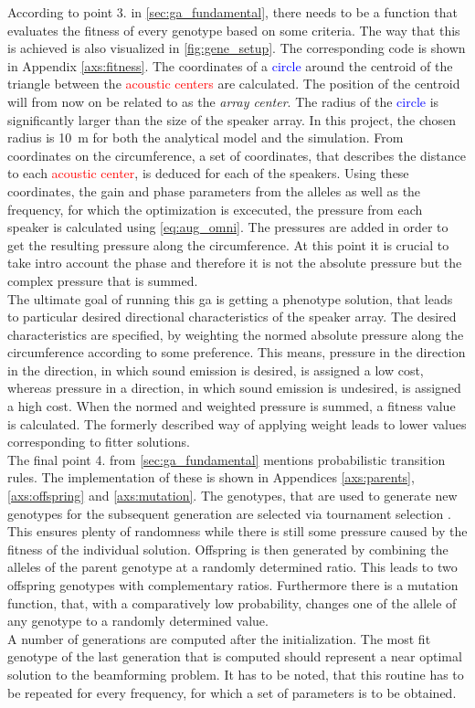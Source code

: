 According to point  3. in \autoref{sec:ga_fundamental}, there needs to be a function that evaluates the fitness of every genotype based on some criteria. The way that this is achieved is also visualized in \autoref{fig:gene_setup}. The corresponding code is shown in Appendix \ref{axs:fitness}. The coordinates of a \textcolor{blue}{circle} around the centroid of the triangle between the \textcolor{red}{acoustic centers} are calculated. The position of the centroid will from now on be related to as the \textit{array center}. The radius of the \textcolor{blue}{circle} is significantly larger than the size of the speaker array. In this project, the chosen radius is \SI{10}{\meter} for both the analytical model and the simulation. From coordinates on the circumference, a set of coordinates, that describes the distance to each \textcolor{red}{acoustic center}, is deduced for each of the speakers. Using these coordinates, the gain and phase parameters from the alleles as well as the frequency, for which the optimization is excecuted, the pressure from each speaker is calculated using \autoref{eq:aug_omni}. The pressures are added in order to get the resulting pressure along the circumference. At this point it is crucial to take intro account the phase and therefore it is not the absolute pressure but the complex pressure that is summed.\\
The ultimate goal of running this \gls{ga} is getting a phenotype solution, that leads to particular desired directional characteristics of the speaker array. The desired characteristics are specified, by weighting the normed absolute pressure along the circumference according to some preference. This means, pressure in the direction in the direction, in which sound emission is desired, is assigned a low cost, whereas pressure in a direction, in which sound emission is undesired, is assigned a high cost. When the normed and weighted pressure is summed, a fitness value is calculated. The formerly described way of applying weight leads to lower values corresponding to fitter solutions.\\
The final point 4. from \autoref{sec:ga_fundamental} mentions probabilistic transition rules. The implementation of these is shown in Appendices \ref{axs:parents}, \ref{axs:offspring} and \ref{axs:mutation}. The genotypes, that are used to generate new genotypes for the subsequent generation are selected via tournament
selection \citep{tournament}. This ensures plenty of randomness while there is still some pressure caused by the fitness of the individual solution.
Offspring is then generated by combining the alleles of the parent genotype at a randomly determined ratio. This leads to two offspring genotypes with complementary ratios.
Furthermore there is a mutation function, that, with a comparatively low probability, changes one of the allele of any genotype to a randomly determined value.\\
A number of generations are computed after the initialization. The most fit genotype of the last generation that is computed should represent a near optimal solution to the beamforming problem. It has to be noted, that this routine has to be repeated for every frequency, for which a set of parameters is to be obtained.



